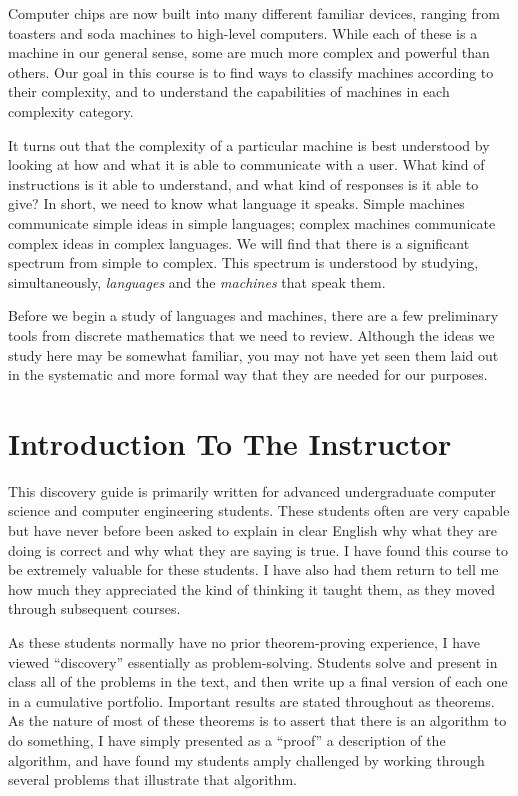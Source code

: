 \documentclass{article}
\begin{document}
Computer chips are now built into many different familiar devices, ranging from toasters and soda machines to high-level computers. While each of these is a machine in our general sense, some are much more complex and powerful than others. Our goal in this course is to find ways to classify machines according to their complexity, and to understand the capabilities of machines in each complexity category.

It turns out that the complexity of a particular machine is best understood by looking at how and what it is able to communicate with a user. What kind of instructions is it able to understand, and what kind of responses is it able to give? In short, we need to know what language it speaks. Simple machines communicate simple ideas in simple languages; complex machines communicate complex ideas in complex languages. We will find that there is a significant spectrum from simple to complex. This spectrum is understood by studying, simultaneously, \emph{languages} and the \emph{machines} that speak them.

Before we begin a study of languages and machines, there are a few preliminary tools from discrete mathematics that we need to review. Although the ideas we study here may be somewhat familiar, you may not have yet seen them laid out in the systematic and more formal way that they are needed for our purposes.



\newpage

\section*{Introduction To The Instructor}

This discovery guide is primarily written for advanced undergraduate computer science and computer engineering students. These students often are very capable but have never before been asked to explain in clear English why what they are doing is correct and why what they are saying is true. I have found this course to be extremely valuable for these students. I have also had them return to tell me how much they appreciated the kind of thinking it taught them, as they moved through subsequent courses.

As these students normally have no prior theorem-proving experience, I have viewed ``discovery'' essentially as problem-solving. Students solve and present in class all of the problems in the text, and then write up a final version of each one in a cumulative portfolio. Important results are stated throughout as theorems. As the nature of most of these theorems is to assert that there is an algorithm to do something, I have simply presented as a ``proof'' a description of the algorithm, and have found my students amply challenged by working through several problems that illustrate that algorithm.
\end{document}

